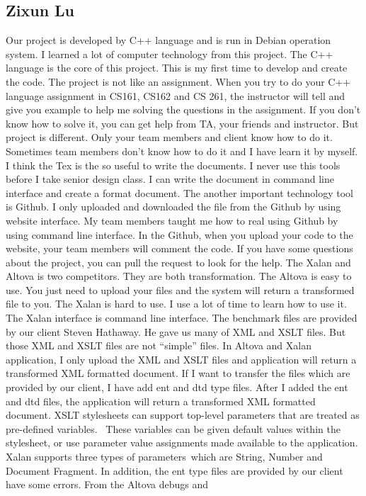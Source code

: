 
\subsection{Zixun Lu}
Our project is developed by C++ language and is run in Debian operation system. I learned a lot of computer technology from this project. The C++ language is the core of this project. This is my first time to develop and create the code. The project is not like an assignment. When you try to do your C++ language assignment in CS161, CS162 and CS 261, the instructor will tell and give you example to help me solving the questions in the assignment. If you don’t know how to solve it, you can get help from TA, your friends and instructor. But project is different. Only your team members and client know how to do it. Sometimes team members don’t know how to do it and I have learn it by myself. I think the Tex is the so useful to write the documents. I never use this tools before I take senior design class. I can write the document in command line interface and create a format document. The another important technology tool is Github. I only uploaded and downloaded the file from the Github by using website interface. My team members taught me how to real using Github by using command line interface. In the Github, when you upload your code to the website, your team members will comment the code. If you have some questions about the project, you can pull the request to look for the help. The Xalan and Altova is two competitors. They are both transformation. The Altova is easy to use. You just need to upload your files and the system will return a transformed file to you. The Xalan is hard to use. I use a lot of time to learn how to use it. The Xalan interface is command line interface. The benchmark files are provided by our client Steven Hathaway. He gave us many of XML and XSLT files. But those XML and XSLT files are not “simple” files. In Altova and Xalan application, I only upload the XML and XSLT files and application will return a transformed XML formatted document. If I want to transfer the files which are provided by our client, I have add ent and dtd type files. After I added the ent and dtd files, the application will return a transformed XML formatted document. XSLT stylesheets can support top-level parameters that are treated as pre-defined variables.  These variables can be given default values within the stylesheet, or use parameter value assignments made available to the application. Xalan supports three types of parameters which are String, Number and Document Fragment. In addition, the ent type files are provided by our client have some errors. From the Altova debugs and 